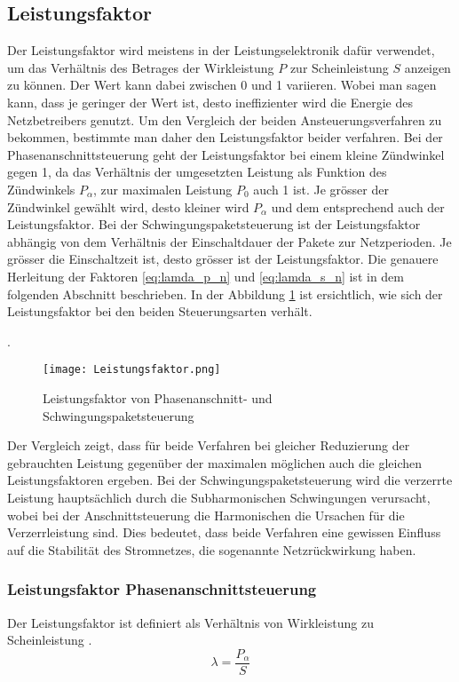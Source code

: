\subsection{Leistungsfaktor}
Der Leistungsfaktor wird meistens in der Leistungselektronik dafür verwendet, um das Verhältnis des Betrages der Wirkleistung $P$ zur Scheinleistung $S$ anzeigen zu können. Der Wert kann dabei zwischen 0 und 1 variieren. Wobei man sagen kann, dass je geringer der Wert ist, desto ineffizienter wird die Energie des Netzbetreibers genutzt. Um den Vergleich der beiden Ansteuerungsverfahren zu bekommen, bestimmte man daher den Leistungsfaktor beider verfahren. Bei der Phasenanschnittsteuerung geht der Leistungsfaktor bei einem kleine Zündwinkel gegen 1, da das Verhältnis der umgesetzten Leistung als Funktion des Zündwinkels $P_{\alpha}$, zur maximalen Leistung $P_0$ auch 1 ist. Je grösser der Zündwinkel gewählt wird, desto kleiner wird $P_{\alpha}$ und dem entsprechend auch der Leistungsfaktor. Bei der Schwingungspaketsteuerung ist der Leistungsfaktor abhängig von dem Verhältnis der Einschaltdauer der Pakete zur Netzperioden. Je grösser die Einschaltzeit ist, desto grösser ist der Leistungsfaktor. Die genauere Herleitung der Faktoren \ref{eq:lamda_p_n} und \ref{eq:lamda_s_n} ist in dem folgenden Abschnitt beschrieben. In der  Abbildung \ref{fig:Leistungsfaktor} ist ersichtlich, wie sich der Leistungsfaktor bei den beiden Steuerungsarten verhält.

\cite{Leistungselektronik}.
\begin{figure}[ht!]
	\centering
	\texttt{[image: Leistungsfaktor.png]}	
	\caption{Leistungsfaktor von Phasenanschnitt- und Schwingungspaketsteuerung}\label{fig:Leistungsfaktor}
\end{figure}


Der Vergleich zeigt, dass für beide Verfahren bei gleicher Reduzierung der gebrauchten Leistung gegenüber der maximalen möglichen auch die gleichen Leistungsfaktoren ergeben. Bei der Schwingungspaketsteuerung wird die verzerrte Leistung hauptsächlich durch die Subharmonischen Schwingungen verursacht, wobei bei der Anschnittsteuerung die Harmonischen die Ursachen für die Verzerrleistung sind. Dies bedeutet, dass beide Verfahren eine gewissen Einfluss auf die Stabilität des Stromnetzes, die sogenannte Netzrückwirkung haben.
\newpage
\subsubsection{Leistungsfaktor Phasenanschnittsteuerung}
Der Leistungsfaktor ist definiert als Verhältnis von Wirkleistung zu Scheinleistung \cite{Leistungselektronik}. 
\begin{equation}\label{eq:lamda_p}
\lambda = \frac{P_{\alpha}}{S}
\end{equation}

